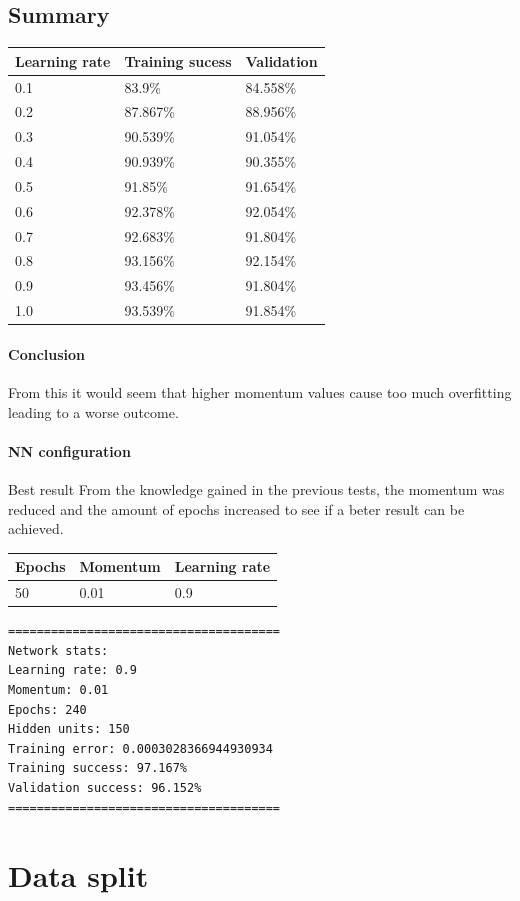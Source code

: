 \documentclass[11pt]{article}
\begin{document}
\hypertarget{summary}{%
\subsection{Summary}\label{summary}}

\begin{longtable}[]{@{}lll@{}}
\toprule
Learning rate & Training sucess & Validation\tabularnewline
\midrule
\endhead
0.1 & 83.9\% & 84.558\%\tabularnewline
0.2 & 87.867\% & 88.956\%\tabularnewline
0.3 & 90.539\% & 91.054\%\tabularnewline
0.4 & 90.939\% & 90.355\%\tabularnewline
0.5 & 91.85\% & 91.654\%\tabularnewline
0.6 & 92.378\% & 92.054\%\tabularnewline
0.7 & 92.683\% & 91.804\%\tabularnewline
0.8 & 93.156\% & 92.154\%\tabularnewline
0.9 & 93.456\% & 91.804\%\tabularnewline
1.0 & 93.539\% & 91.854\%\tabularnewline
\bottomrule
\end{longtable}

    \hypertarget{conclusion}{%
\paragraph{Conclusion}\label{conclusion}}

From this it would seem that higher momentum values cause too much
overfitting leading to a worse outcome.

\hypertarget{nn-configuration}{%
\paragraph{NN configuration}\label{nn-configuration}}

Best result From the knowledge gained in the previous tests, the
momentum was reduced and the amount of epochs increased to see if a
beter result can be achieved.

\begin{longtable}[]{@{}lll@{}}
\toprule
Epochs & Momentum & Learning rate\tabularnewline
\midrule
\endhead
50 & 0.01 & 0.9\tabularnewline
\bottomrule
\end{longtable}

\begin{verbatim}
======================================
Network stats: 
Learning rate: 0.9
Momentum: 0.01
Epochs: 240
Hidden units: 150
Training error: 0.0003028366944930934
Training success: 97.167%
Validation success: 96.152%
======================================
\end{verbatim}

    \hypertarget{data-split}{%
\section{Data split}\label{data-split}}
\end{document}
